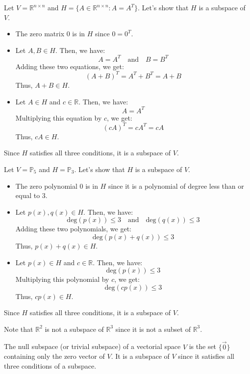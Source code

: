 \begin{eg}
    Let $V = \mathbb{R}^{n \times n }$ and $H = \{A \in \mathbb{R}^{n \times n} : A = A^T\}$. Let's show that $H$ is a subspace of $V$.
    \begin{itemize}[itemsep=1pt,label=$\circ$]
        \item The zero matrix $0$ is in $H$ since $0 = 0^T$.
        \item Let $A, B \in H$. Then, we have:
        \[ A = A^T \quad \text{and} \quad B = B^T \]
        Adding these two equations, we get:
        \[ (A + B)^T = A^T + B^T = A + B \]
        Thus, $A + B \in H$.
        \item Let $A \in H$ and $c \in \mathbb{R}$. Then, we have:
        \[ A = A^T \]
        Multiplying this equation by $c$, we get:
        \[ (cA)^T = cA^T = cA \]
        Thus, $cA \in H$.
    \end{itemize}
    Since $H$ satisfies all three conditions, it is a subspace of $V$.
\end{eg}

\begin{eg}
    Let $V = \mathbb{P}_5$ and $H = \mathbb{P}_3$. Let's show that $H$ is a subspace of $V$.
    \begin{itemize}[itemsep=1pt,label=$\circ$]
        \item The zero polynomial $0$ is in $H$ since it is a polynomial of degree less than or equal to $3$.
        \item Let $p(x), q(x) \in H$. Then, we have:
        \[ \text{deg}(p(x)) \leq 3 \quad \text{and} \quad \text{deg}(q(x)) \leq 3 \]
        Adding these two polynomials, we get:
        \[ \text{deg}(p(x) + q(x)) \leq 3 \]
        Thus, $p(x) + q(x) \in H$.
        \item Let $p(x) \in H$ and $c \in \mathbb{R}$. Then, we have:
        \[ \text{deg}(p(x)) \leq 3 \]
        Multiplying this polynomial by $c$, we get:
        \[ \text{deg}(cp(x)) \leq 3 \]
        Thus, $cp(x) \in H$.
    \end{itemize}
    Since $H$ satisfies all three conditions, it is a subspace of $V$.
\end{eg}
Note that $\mathbb{R}^2$ is not a subspace of $\mathbb{R}^3$ since it is not a subset of $\mathbb{R}^3$.
\begin{definition}
    The null subspace (or trivial subspace) of a vectorial space $V$ is the set $\{\vec{0}\}$ containing only the zero vector of $V$. It is a subspace of $V$ since it satisfies all three conditions of a subspace.
\end{definition}

